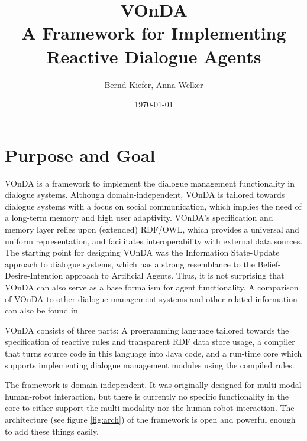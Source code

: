 \documentclass[a4paper]{report}
\newcommand{\vonda}{VOnDA\xspace}
\begin{document}
\title{\vonda\\\Large A Framework for Implementing Reactive Dialogue Agents}

\author{Bernd Kiefer, Anna Welker}
\date{\today}

\maketitle

\tableofcontents

\chapter{Purpose and Goal}

\vonda is a framework to implement the dialogue management functionality in
dialogue systems. Although domain-independent, \vonda is tailored towards
dialogue systems with a focus on social communication, which implies the need
of a long-term memory and high user adaptivity. \vonda's specification and
memory layer relies upon (extended) RDF/OWL, which provides a universal and
uniform representation, and facilitates interoperability with external data
sources. The starting point for designing \vonda was the Information
State-Update approach to dialogue systems, which has a strong resemblance to
the Belief-Desire-Intention approach to Artificial Agents. Thus, it is not
surprising that \vonda can also serve as a base formalism for agent
functionality. A comparison of \vonda to other dialogue management systems and
other related information can also be found in \cite{kieferetal_vonda_2019}.

\vonda consists of three parts: A programming language tailored towards the
specification of reactive rules and transparent RDF data store usage, a
compiler that turns source code in this language into Java code, and a run-time
core which supports implementing dialogue management modules using the compiled
rules.

The framework is domain-independent. It was originally designed for multi-modal
human-robot interaction, but there is currently no specific functionality in
the core to either support the multi-modality nor the human-robot
interaction. The architecture (see figure \ref{fig:arch}) of the framework is
open and powerful enough to add these things easily.

\end{document}
